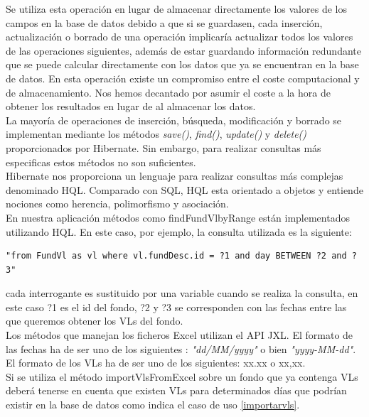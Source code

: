 \documentclass[12pt, a4paper]{book}
\begin{document}
Se utiliza esta operación en lugar de almacenar directamente los valores de los campos en la base de datos debido a que si se guardasen, cada inserción, actualización o borrado de una operación implicaría actualizar todos los valores de las operaciones siguientes, además de estar guardando información redundante que se puede calcular directamente con los datos que ya se encuentran en la base de datos. En esta operación existe un compromiso entre el coste computacional y de almacenamiento. Nos hemos decantado por asumir el coste a la hora de obtener los resultados en lugar de al almacenar los datos.\\

La mayoría de operaciones de inserción, búsqueda, modificación y borrado se implementan mediante los métodos \textit{save()}, \textit{find()}, \textit{update()} y \textit{delete()} proporcionados por Hibernate. Sin embargo, para realizar consultas más especificas estos métodos no son suficientes.\\

Hibernate nos proporciona un lenguaje para realizar consultas más complejas denominado HQL. Comparado con SQL, HQL esta orientado a objetos y entiende nociones como herencia, polimorfismo y asociación.\\

En nuestra aplicación métodos como findFundVlbyRange están implementados utilizando HQL. En este caso, por ejemplo, la consulta utilizada es la siguiente:

\begin{verbatim}
"from FundVl as vl where vl.fundDesc.id = ?1 and day BETWEEN ?2 and ?3"
\end{verbatim} 
cada interrogante es sustituido por una variable cuando se realiza la consulta, en este caso ?1 es el id del fondo, ?2 y ?3 se corresponden con las fechas entre las que queremos obtener los \gls{VL}s del fondo.\\

Los métodos que manejan los ficheros Excel utilizan el \gls{API} JXL. El formato de las fechas ha de ser uno de los siguientes : \textit{"dd/MM/yyyy"} o bien \textit{"yyyy-MM-dd"}. El formato de los \gls{VL}s ha de ser uno de los siguientes: xx.xx o xx,xx.\\

Si se utiliza el método importVlsFromExcel sobre un fondo que ya contenga \gls{VL}s deberá tenerse en cuenta que existen \gls{VL}s para determinados días que podrían existir en la base de datos como indica el caso de uso \ref{importarvls}.
\end{document}
